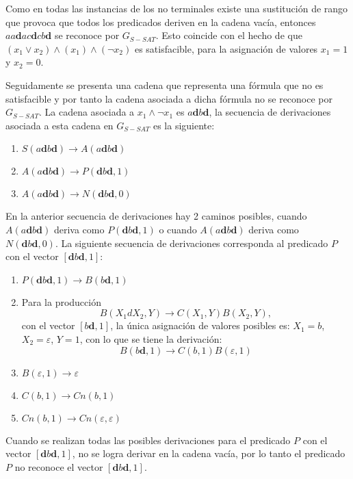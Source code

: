 \documentclass[12pt]{article}
\begin{document}
Como en todas las instancias de los no terminales existe una sustitución de rango que provoca que todos los predicados deriven en la cadena vacía, entonces $aa\mathbf{d}ac\mathbf{d}cb\mathbf{d}$ se reconoce por $G_{S-SAT}$. 
Esto coincide con el hecho de que $(x_1 \vee x_2) \wedge (x_1) \wedge (\neg x_2)$ es satisfacible, para la asignación de valores $x_1=1$ y $x_2=0$.

Seguidamente se presenta una cadena que representa una fórmula que no es satisfacible y por tanto la cadena asociada
a dicha fórmula no se reconoce por $G_{S-SAT}$. La cadena asociada a $x_1 \wedge \neg x_1$ es $a\mathbf{d}b\mathbf{d}$,
la secuencia de derivaciones asociada a esta cadena en $G_{S-SAT}$ es la siguiente:

\begin{enumerate}
    \item $S(a\mathbf{d}b\mathbf{d})\to A(a\mathbf{d}b\mathbf{d})$
    \item $A(a\mathbf{d}b\mathbf{d})\to P(\mathbf{d}b\mathbf{d},1)$
    \item $A(a\mathbf{d}b\mathbf{d})\to N(\mathbf{d}b\mathbf{d},0)$
\end{enumerate}

En la anterior secuencia de derivaciones hay 2 caminos posibles, cuando $A(a\mathbf{d}b\mathbf{d})$ deriva como
$P(\mathbf{d}b\mathbf{d},1)$ o cuando $A(a\mathbf{d}b\mathbf{d})$ deriva como $N(\mathbf{d}b\mathbf{d},0)$. La 
siguiente secuencia de derivaciones corresponda al predicado $P$ con el vector $[\mathbf{d}b\mathbf{d},1]$:

\begin{enumerate}[start=2]
    \item $P(\mathbf{d}b\mathbf{d},1) \to B(b\mathbf{d},1)$
    \item Para la producción $$B(X_1dX_2,Y)\to C(X_1,Y) B(X_2,Y),$$ con el vector $[b\mathbf{d},1]$,
          la única asignación de valores posibles es: $X_1=b$, $X_2=\varepsilon$, $Y=1$, con lo que se tiene la derivación:
          $$B(b\mathbf{d},1)\to C(b,1) B(\varepsilon,1)$$
    \item $B(\varepsilon,1) \to \varepsilon$
    \item $C(b,1)\to Cn(b,1)$
    \item $Cn(b,1)\to Cn(\varepsilon,\varepsilon)$
\end{enumerate}

Cuando se realizan todas las posibles derivaciones para el predicado $P$ con el vector $[\mathbf{d}b\mathbf{d},1]$, no se logra derivar en la cadena
vacía, por lo tanto el predicado $P$ no reconoce el vector $[\mathbf{d}b\mathbf{d},1]$.
\end{document}
